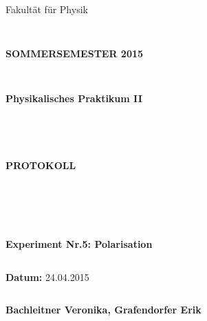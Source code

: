 \documentclass{article}
\begin{document}
\thispagestyle{empty}
			\begin{center}
			\Large{Fakultät für Physik}\\
			\end{center}
\begin{verbatim}


\end{verbatim}
			\begin{center}
			\textbf{\LARGE SOMMERSEMESTER 2015}
			\end{center}
\begin{verbatim}


\end{verbatim}
			\begin{center}
			\textbf{\LARGE{Physikalisches Praktikum II}}
			\end{center}
\begin{verbatim}




\end{verbatim}

			\begin{center}
			\textbf{\LARGE{PROTOKOLL}}
			\end{center}
			
\begin{verbatim}





\end{verbatim}

			\begin{flushleft}
			\textbf{\Large{Experiment Nr.5: Polarisation}}\\
			\LARGE{}	
			\end{flushleft}

\begin{verbatim}

\end{verbatim}	
			\begin{flushleft}
			\textbf{\Large{Datum:}} \Large{24.04.2015}
			\end{flushleft}
			
\begin{verbatim}
\end{verbatim}
		\begin{flushleft}
			\textbf{\Large{Bachleitner Veronika, Grafendorfer Erik}} 
			\end{flushleft}
\end{document}
